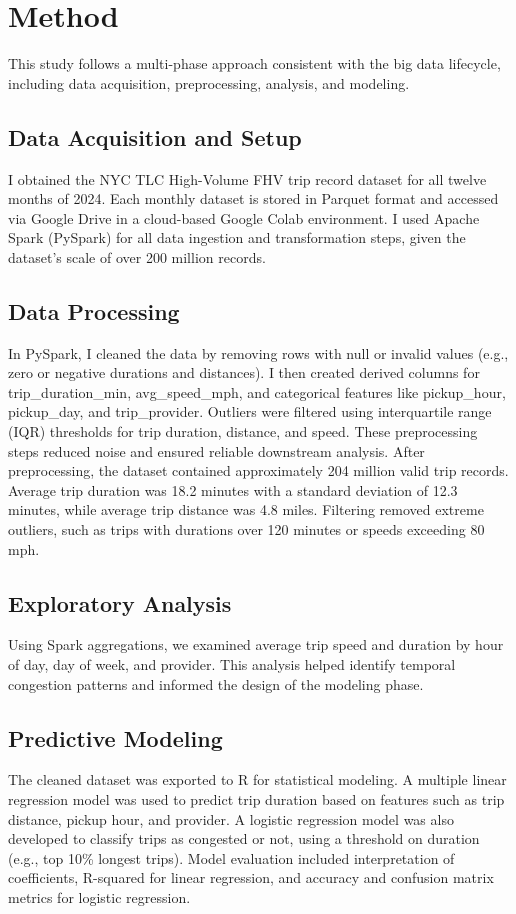 \documentclass{article}
\begin{document}
\section{Method}
This study follows a multi-phase approach consistent with the big data lifecycle, including data acquisition, preprocessing, analysis, and modeling.

\subsection{Data Acquisition and Setup}
I obtained the NYC TLC High-Volume FHV trip record dataset for all twelve months of 2024. Each monthly dataset is stored in Parquet format and accessed via Google Drive in a cloud-based Google Colab environment. I used Apache Spark (PySpark) for all data ingestion and transformation steps, given the dataset's scale of over 200 million records.

\subsection{Data Processing}
In PySpark, I cleaned the data by removing rows with null or invalid values (e.g., zero or negative durations and distances). I then created derived columns for trip_duration_min, avg_speed_mph, and categorical features like pickup_hour, pickup_day, and trip_provider. Outliers were filtered using interquartile range (IQR) thresholds for trip duration, distance, and speed. These preprocessing steps reduced noise and ensured reliable downstream analysis. After preprocessing, the dataset contained approximately 204 million valid trip records. Average trip duration was 18.2 minutes with a standard deviation of 12.3 minutes, while average trip distance was 4.8 miles. Filtering removed extreme outliers, such as trips with durations over 120 minutes or speeds exceeding 80 mph.

\subsection{Exploratory Analysis}
Using Spark aggregations, we examined average trip speed and duration by hour of day, day of week, and provider. This analysis helped identify temporal congestion patterns and informed the design of the modeling phase.

\subsection{Predictive Modeling}
The cleaned dataset was exported to R for statistical modeling. A multiple linear regression model was used to predict trip duration based on features such as trip distance, pickup hour, and provider. A logistic regression model was also developed to classify trips as congested or not, using a threshold on duration (e.g., top 10\% longest trips). Model evaluation included interpretation of coefficients, R-squared for linear regression, and accuracy and confusion matrix metrics for logistic regression.
\end{document}
